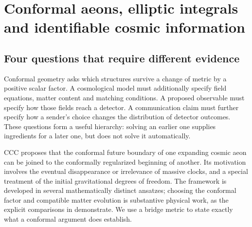 \chapter{Conformal aeons, elliptic integrals and identifiable cosmic information}
\label{ch:cyclic-cosmology}


\section{Four questions that require different evidence}

Conformal geometry asks which structures survive a change of metric by a
positive scalar factor. A cosmological model must additionally specify field
equations, matter content and matching conditions. A proposed observable must
specify how those fields reach a detector. A communication claim must further
specify how a sender's choice changes the distribution of detector outcomes.
These questions form a useful hierarchy: solving an earlier one supplies
ingredients for a later one, but does not solve it automatically.

CCC proposes that the conformal future boundary of one expanding cosmic
aeon can be joined to the conformally regularized beginning of another. Its
motivation involves the eventual disappearance or irrelevance of massive
clocks, and a special treatment of the initial gravitational degrees of
freedom. The framework is developed in several mathematically distinct
ansatzes; choosing the conformal factor and compatible matter evolution is
substantive physical work, as the explicit comparisons in
\citet[Secs.~2--7]{CCMarkwellStevens2023} demonstrate. We use a bridge metric
to state exactly what a conformal argument does establish.

